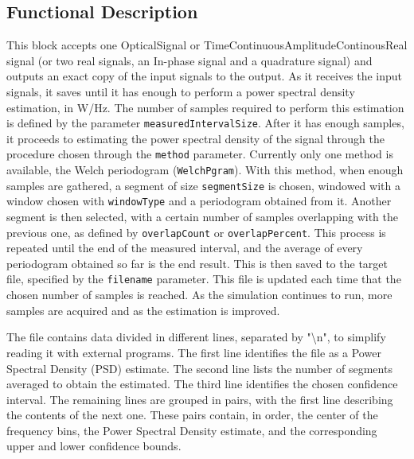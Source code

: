 \begin{refsection}
\subsection*{Functional Description}
This block accepts one OpticalSignal or TimeContinuousAmplitudeContinousReal signal
(or two real signals, an In-phase signal and a quadrature signal) and outputs
an exact copy of the input signals to the output. As it receives the input
signals, it saves until it has enough to perform a power spectral density
estimation, in W/Hz. The number of samples required to perform this estimation is defined
by the parameter \texttt{measuredIntervalSize}. After it has enough samples, it
proceeds to estimating the power spectral density of the signal through the
procedure chosen through the \texttt{method} parameter. Currently only one
method is available, the Welch periodogram (\texttt{WelchPgram}).
With this method, when enough samples are gathered, a segment of size
\texttt{segmentSize} is chosen, windowed with a window chosen with
\texttt{windowType} and a periodogram obtained from it. Another
segment is then selected, with a certain number of samples overlapping with the
previous one, as defined by \texttt{overlapCount} or \texttt{overlapPercent}.
This process is repeated until the end of the measured interval, and the average
of every periodogram obtained so far is the end result.
This is then saved to the target file, specified by the \texttt{filename}
parameter. This file is updated each time that the chosen number of samples is reached.
As the simulation continues to run, more samples are acquired and as the estimation is improved.

The file contains data divided in different lines, separated by "\textbackslash n", to simplify reading it with
external programs. The first line identifies the file as a Power Spectral Density (PSD) estimate.
The second line lists the number of segments averaged to obtain the estimated.
The third line identifies the chosen confidence interval.
The remaining lines are grouped in pairs, with the first line describing the
contents of the next one. These pairs contain, in order, the center of the
frequency bins, the Power Spectral Density estimate, and the corresponding upper and lower
confidence bounds.


\end{refsection}
